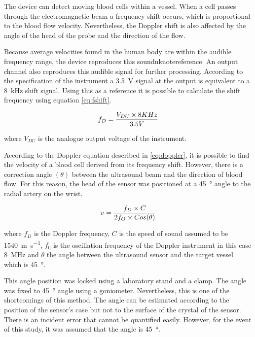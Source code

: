The device can detect moving blood cells within a vessel.  When a cell passes through the electromagnetic beam a frequency shift occurs, which is proportional to the blood flow velocity. Nevertheless, the Doppler shift is also affected by the angle of the head of the probe and the direction of the flow.

Because average velocities found in the human body are within the audible frequency range, the device reproduces this soundnknote{reference}. An output channel also reproduces this audible signal for further processing. According to the specification of the instrument a \SI{3.5}{\volt} signal at the output is equivalent to a \SI{8}{\kilo\hertz} shift signal. Using this as a reference it is possible to calculate the shift frequency using equation \ref{eq:fshift}.

\begin{align}
	\label{eq:fshift}
	f_D = \frac{V_{DU} \times 8 KHz}{3.5V} \tagaddtext{[\si{\hertz}]}
\end{align}  

where $V_{DU}$ is the analogue output voltage of the instrument. 

According to the Doppler equation described in \ref{eq:doppler}, it is possible to find the velocity of a blood cell derived from its frequency shift. However, there is a correction angle $(\theta)$ between the ultrasound beam and the direction of blood flow. For this reason, the head of the sensor was positioned at a \SI{45}{\degree} angle to the radial artery on the wrist.

\begin{align}
	\label{eq:doppler}
	v = \frac{f_D \times C}{2 f_O \times Cos(\theta)} \tagaddtext{[\si{\meter\per\second}]}
\end{align}

where $f_D$ is the Doppler frequency, $C$ is the speed of sound assumed to be \SI{1540}{\meter\per\second}, $f_0$ is the oscillation frequency of the Doppler instrument in this case \SI{8}{\mega\hertz} and $\theta$ the angle between the ultrasound sensor and the target vessel which is \SI{45}{\degree}.

This angle position was locked using a laboratory stand and a clamp. The angle was fixed to \SI{45}{\degree} angle using a goniometer. Nevertheless, this is one of the shortcomings of this method. The angle can be estimated according to the position of the sensor's case but not to the surface of the crystal of the sensor. There is an incident error that cannot be quantified easily. However, for the event of this study, it was assumed that the angle is \SI{45}{\degree}.


